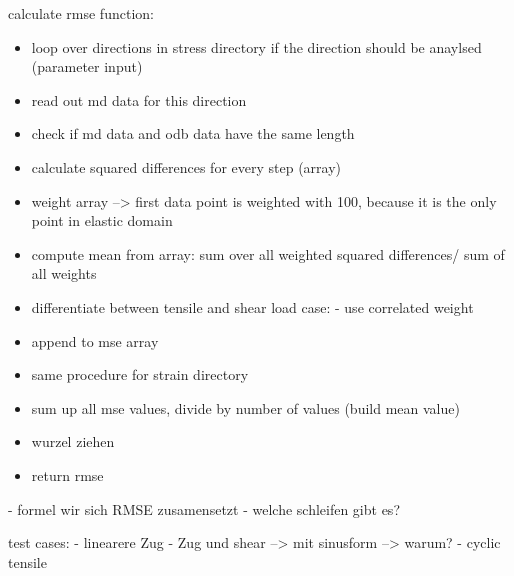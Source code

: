 \begin{enumerate}
    \end{enumerate}

    
    
    calculate rmse function:

    \begin{itemize}
        \item loop over directions in stress directory if the direction should be anaylsed (parameter input)
        \item read out md data for this direction
        \item check if md data and odb data have the same length
        \item calculate squared differences for every step (array)
        \item weight array --> first data point is weighted with 100, because it is the only point in elastic domain 
        \item compute mean from array: sum over all weighted squared differences/ sum of all weights
        \item differentiate between tensile and shear load case:
            - use correlated weight 
        \item append to mse array
        \item same procedure  for strain directory
        \item sum up all mse values, divide by number of values (build mean value)
        \item wurzel ziehen
        \item return rmse
    \end{itemize}
        
    
    
    
    - formel wir sich RMSE zusamensetzt
    - welche schleifen gibt es?
    

    test cases:
    - linearere Zug
    - Zug und shear --> mit sinusform --> warum? 
    - cyclic tensile 
    